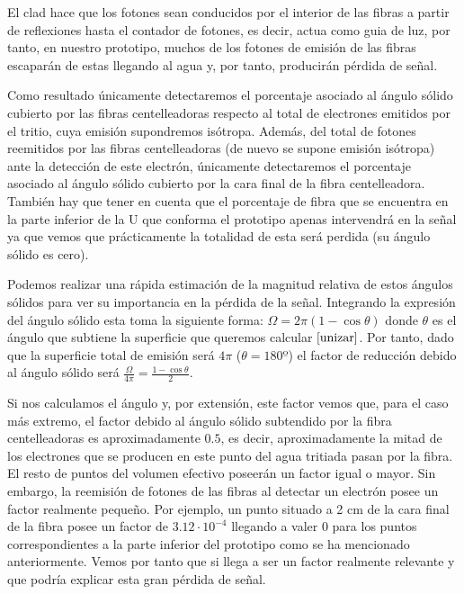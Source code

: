 El clad hace que los fotones sean conducidos por el interior de las fibras a partir de reflexiones hasta el contador de fotones, es decir, actua como guia de luz, por tanto, en nuestro prototipo, muchos de los fotones de emisión de las fibras escaparán de estas llegando al agua y, por tanto, producirán pérdida de señal. 

Como resultado únicamente detectaremos el porcentaje asociado al ángulo sólido cubierto por las fibras centelleadoras respecto al total de electrones emitidos por el tritio, cuya emisión supondremos isótropa. Además, del total de fotones reemitidos por las fibras centelleadoras (de nuevo se supone emisión isótropa) ante la detección de este electrón, únicamente detectaremos el porcentaje asociado al ángulo sólido cubierto por la cara final de la fibra centelleadora. También hay que tener en cuenta que el porcentaje de fibra que se encuentra en la parte inferior de la U que conforma el prototipo apenas intervendrá en la señal ya que vemos que prácticamente la totalidad de esta será perdida (su ángulo sólido es cero). 

Podemos realizar una rápida estimación de la magnitud relativa de estos ángulos sólidos para ver su importancia en la pérdida de la señal. Integrando la expresión del ángulo sólido esta toma la siguiente forma: $\Omega=2\pi(1-\cos{\theta})$ donde $\theta$ es el ángulo que subtiene la superficie que queremos calcular$~\cite{unizar}$. Por tanto, dado que la superficie total de emisión será $4\pi$ ($\theta=180º$) el factor de reducción debido al ángulo sólido será $\frac{\Omega}{4\pi}=\frac{1-\cos{\theta}}{2}$. 

Si nos calculamos el ángulo y, por extensión, este factor vemos que, para el caso más extremo, el factor debido al ángulo sólido subtendido por la fibra centelleadoras es aproximadamente $0.5$, es decir, aproximadamente la mitad de los electrones que se producen en este punto del agua tritiada pasan por la fibra. El resto de puntos del volumen efectivo poseerán un factor igual o mayor. Sin embargo, la reemisión de fotones de las fibras al detectar un electrón posee un factor realmente pequeño. Por ejemplo, un punto situado a 2 cm de la cara final de la fibra posee un factor de $3.12\cdotp 10^{-4}$ llegando a valer $0$ para los puntos correspondientes a la parte inferior del prototipo como se ha mencionado anteriormente. Vemos por tanto que si llega a ser un factor realmente relevante y que podría explicar esta gran pérdida de señal. 

